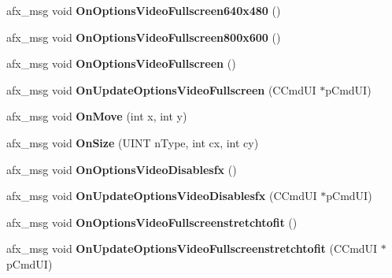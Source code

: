 \begin{DoxyCompactItemize}
\mbox{\label{class_main_wnd_ae205b52e438eb0305310ca81436967db}} 
afx\+\_\+msg void {\bfseries On\+Options\+Video\+Fullscreen640x480} ()
\item 
\mbox{\label{class_main_wnd_a2b287efa1b6df3057aedd5e5e6a85d6e}} 
afx\+\_\+msg void {\bfseries On\+Options\+Video\+Fullscreen800x600} ()
\item 
\mbox{\label{class_main_wnd_af40af1ba864ff1718ef3fe96279656d2}} 
afx\+\_\+msg void {\bfseries On\+Options\+Video\+Fullscreen} ()
\item 
\mbox{\label{class_main_wnd_a6d5a346212032eb5299be7575fbafb60}} 
afx\+\_\+msg void {\bfseries On\+Update\+Options\+Video\+Fullscreen} (C\+Cmd\+UI $\ast$p\+Cmd\+UI)
\item 
\mbox{\label{class_main_wnd_ab6523035512af1482f5a9656ea556661}} 
afx\+\_\+msg void {\bfseries On\+Move} (int x, int y)
\item 
\mbox{\label{class_main_wnd_a8aae2e29b1e1426dbfce42deade38485}} 
afx\+\_\+msg void {\bfseries On\+Size} (U\+I\+NT n\+Type, int cx, int cy)
\item 
\mbox{\label{class_main_wnd_a18272b2ec178d9123804805b82fc3db6}} 
afx\+\_\+msg void {\bfseries On\+Options\+Video\+Disablesfx} ()
\item 
\mbox{\label{class_main_wnd_aab300c45188274983a69dcddb774b1d8}} 
afx\+\_\+msg void {\bfseries On\+Update\+Options\+Video\+Disablesfx} (C\+Cmd\+UI $\ast$p\+Cmd\+UI)
\item 
\mbox{\label{class_main_wnd_a261e810d4a9386c968d30a3449389f54}} 
afx\+\_\+msg void {\bfseries On\+Options\+Video\+Fullscreenstretchtofit} ()
\item 
\mbox{\label{class_main_wnd_a7556a5adf4120d6c9561f21e4a9fea82}} 
afx\+\_\+msg void {\bfseries On\+Update\+Options\+Video\+Fullscreenstretchtofit} (C\+Cmd\+UI $\ast$p\+Cmd\+UI)
\item 
\mbox{\label{class_main_wnd_a0418a1b43cf05159e2e0679bc538e669}} 

\end{DoxyCompactItemize}
